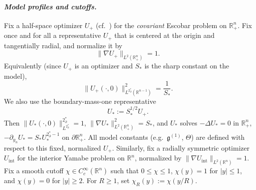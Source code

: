 \documentclass[11pt,reqno,a4paper]{amsart}
\newcommand{\R}{\mathbb{R}}
\numberwithin{equation}{section}
\theoremstyle{plain}
\theoremstyle{remark}
\theoremstyle{plain}
\begin{document}
\paragraph{\emph{Model profiles and cutoffs.}}
Fix a half-space optimizer $U_+$ (cf.\ \cite[Eq.~(2)]{Escobar1988}) for the \emph{covariant} Escobar problem on $\R^n_+$. Fix once and for all a representative $U_+$ that is centered at the origin and tangentially radial, and normalize it by
\[
\|\nabla U_+\|_{L^2(\R^n_+)}=1.
\]
Equivalently (since $U_+$ is an optimizer and $S_\ast$ is the sharp constant on the model),
\[
\|U_+(\cdot,0)\|_{L^{2^*_\partial}(\R^{n-1})}^{2}
=\frac{1}{S_\ast}.
\]
We also use the boundary-mass-one representative
\begin{equation}\label{eq:mass-one-Uplus}
U_\ast:=S_\ast^{1/2}U_+.
\end{equation}
Then $\|U_\ast(\cdot,0)\|_{L^{2^*_\partial}}^{2^*_\partial}=1$,
$\|\nabla U_\ast\|_{L^2(\R^n_+)}^2=S_\ast$, and $U_\ast$ solves
$-\Delta U_\ast=0$ in $\R^n_+$,
$-\partial_{y_n}U_\ast=S_\ast U_\ast^{2^*_\partial-1}$ on $\partial\R^n_+$.
All model constants (e.g.\ $\mathfrak g^{(1)}$, $\Theta$) are defined with respect to this fixed, normalized $U_+$.
Similarly, fix a radially symmetric optimizer $U_{\mathrm{int}}$ for the interior Yamabe problem on $\R^n$, normalized by $\|\nabla U_{\mathrm{int}}\|_{L^2(\R^n)}=1$.
Fix a smooth cutoff $\chi\in C_c^\infty(\R^n)$ such that $0\le\chi\le 1$, $\chi(y)=1$ for $|y|\le 1$, and $\chi(y)=0$ for $|y|\ge 2$. For $R\ge 1$, set $\chi_R(y):=\chi(y/R)$.
\end{document}
